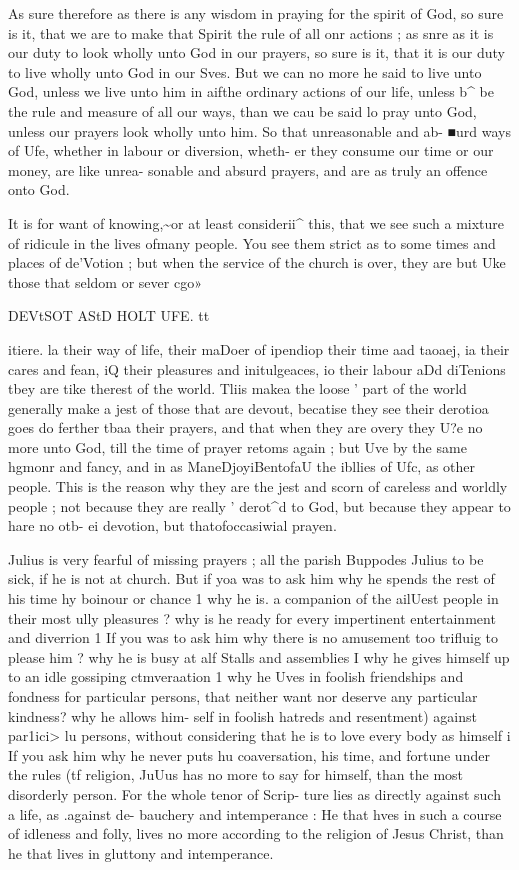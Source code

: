 \documentclass[
]{book}
\begin{document}
As sure therefore as there is any wisdom in praying for the spirit of God, so sure is it, that we are to make that Spirit the rule of all onr actions ; as snre as it is our duty to look wholly unto God in our prayers, so sure is it, that it is our duty to live wholly unto God in our Sves. But we can no more he said to live unto God, unless we live unto him in aifthe ordinary actions of our life, unless b\^{} be the rule and measure of all our ways, than we cau be said lo pray unto God, unless our prayers look wholly unto him. So that unreasonable and ab- ■urd ways of Ufe, whether in labour or diversion, wheth- er they consume our time or our money, are like unrea- sonable and absurd prayers, and are as truly an offence onto God.

It is for want of knowing,\textasciitilde or at least considerii\^{} this, that we see such a mixture of ridicule in the lives ofmany people. You see them strict as to some times and places of de'Votion ; but when the service of the church is over, they are but Uke those that seldom or sever cgo»

DEVtSOT AStD HOLT UFE. tt

itiere. la their way of life, their maDoer of ipendiop their time aad taoaej, ia their cares and fean, iQ their pleasures and initulgeaces, io their labour aDd diTenions tbey are tike therest of the world. Tliis makea the loose ' part of the world generally make a jest of those that are devout, becatise they see their derotioa goes do ferther tbaa their prayers, and that when they are overy they U?e no more unto God, till the time of prayer retoms again ; but Uve by the same hgmonr and fancy, and in as ManeDjoyiBentofaU the ibllies of Ufc, as other people. This is the reason why they are the jest and scorn of careless and worldly people ; not because they are really ' derot\^{}d to God, but because they appear to hare no otb- ei devotion, but thatofoccasiwial prayen.

Julius is very fearful of missing prayers ; all the parish Buppodes Julius to be sick, if he is not at church. But if yoa was to ask him why he spends the rest of his time hy boinour or chance 1 why he is. a companion of the ailUest people in their most ully pleasures ? why is he ready for every impertinent entertainment and diverrion 1 If you was to ask him why there is no amusement too trifluig to please him ? why he is busy at alf Stalls and assemblies I why he gives himself up to an idle gossiping ctmveraation 1 why he Uves in foolish friendships and fondness for particular persons, that neither want nor deserve any particular kindness? why he allows him- self in foolish hatreds and resentment) against par1ici\textgreater{} lu persons, without considering that he is to love every body as himself i If you ask him why he never puts hu coaversation, his time, and fortune under the rules (tf religion, JuUus has no more to say for himself, than the most disorderly person. For the whole tenor of Scrip- ture lies as directly against such a life, as .against de- bauchery and intemperance : He that hves in such a course of idleness and folly, lives no more according to the religion of Jesus Christ, than he that lives in gluttony and intemperance.
\end{document}
